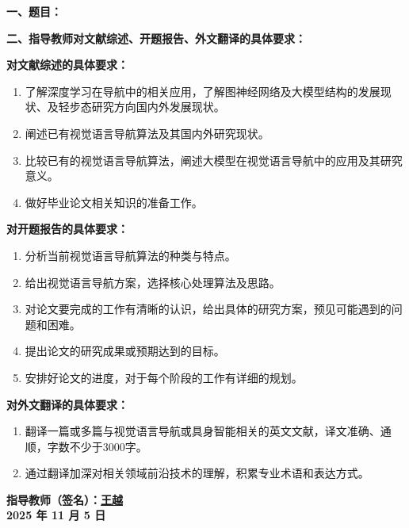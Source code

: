 {
    \setlength{\parindent}{0em}
    \par {\bfseries 一、题目：\Title}
    \\
    \par {\bfseries 二、指导教师对文献综述、开题报告、外文翻译的具体要求：}
}

\vspace{1em}
{
\textbf{对文献综述的具体要求：}
\begin{enumerate}[leftmargin=2em]
    \item 了解深度学习在导航中的相关应用，了解图神经网络及大模型结构的发展现状、及轻步态研究方向国内外发展现状。
    \item 阐述已有视觉语言导航算法及其国内外研究现状。
    \item 比较已有的视觉语言导航算法，阐述大模型在视觉语言导航中的应用及其研究意义。
    \item 做好毕业论文相关知识的准备工作。
\end{enumerate}

\textbf{对开题报告的具体要求：}
\begin{enumerate}[leftmargin=2em]
    \item 分析当前视觉语言导航算法的种类与特点。
    \item 给出视觉语言导航方案，选择核心处理算法及思路。
    \item 对论文要完成的工作有清晰的认识，给出具体的研究方案，预见可能遇到的问题和困难。
    \item 提出论文的研究成果或预期达到的目标。
    \item 安排好论文的进度，对于每个阶段的工作有详细的规划。
\end{enumerate}

\textbf{对外文翻译的具体要求：}
\begin{enumerate}[leftmargin=2em]
    \item 翻译一篇或多篇与视觉语言导航或具身智能相关的英文文献，译文准确、通顺，字数不少于3000字。
    \item 通过翻译加深对相关领域前沿技术的理解，积累专业术语和表达方式。
\end{enumerate}
}

\mbox{} \vfill

\begin{flushright}
    \bfseries {}
    指导教师（签名）：\underline{\quad 王越 \quad} \\
    2025 年 11 月 5 日
\end{flushright}
